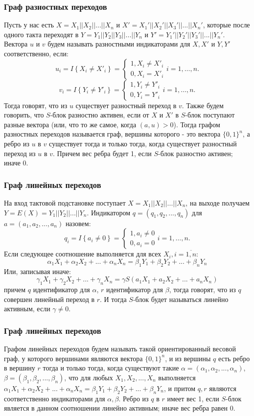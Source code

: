 \documentclass{beamer}
\begin{document}
  \begin{frame}
    \frametitle{Граф разностных переходов}
Пусть у нас есть $X=X_1||X_2||...||X_n$ и $X'=X_1'||X_2'||X_3'||...||X_n'$, которые после одного такта переходят в $Y=Y_1||Y_2||Y_3||...||Y_n$ и $Y'=Y_1'||Y_2'||Y_3'||...||Y_n'$. Вектора $u$ и $v$ будем называть разностными индикаторами для $X, X'$ и $Y, Y'$ соответственно, если:
$$
u_i=I\left\{X_i\ne X'_i\right\}=\left\{ \begin{array}{c}
1,X_i\ne X'_i \\
0,X_i=X'_i \end{array}
\right.i=1,\dots , n.
$$
$$
v_i=I\left\{Y_i\ne Y'_i\right\}=\left\{ \begin{array}{c}
1,Y_i\ne Y'_i \\
0,Y_i=Y'_i \end{array}
\right.i=1,\dots , n.
$$
Тогда говорят, что из $u$ существует разностный переход в $v$.
Также будем говорить, что $S$-блок разностно активен, если от $X$ и $X'$ в $S$-блок поступают разные вектора (или, что то же самое, когда $(a,u) > 0$).
Тогда графом разностных переходов называется граф, вершины которого - это вектора $\{0, 1\}^n$, а ребро из $u$ в $v$ существует тогда и только тогда, когда существует разностный переход из $u$ в $v$. Причем вес ребра будет 1, если $S$-блок разностно активен; иначе 0.

  \end{frame}
\begin{frame}
    \frametitle{Граф линейных переходов}
На вход тактовой подстановке поступает $X = X_1||X_2||...||X_n$, на выходе получаем $Y=E(X) = Y_1||Y_2||...||Y_n$.
Индикатором $q = (q_1, q_2, ..., q_n)$ для $a=(a_1, a_2, ..., a_n)$ назовем:
$$q_i=I\left\{a_i\ne 0\right\}=\left\{ \begin{array}{c}
1,a_i \neq 0 \\
0,a_i = 0\end{array}
\right.i=1,\dots , n.$$
Если следующее соотношение выполняется для всех $X_i, i=\overline{1,n}$:
$$\alpha_1X_1 + \alpha_2X_2 + ... + \alpha_nX_n = \beta_1Y_1 + \beta_2Y_2 + ... + \beta_nY_n$$
Или, записывая иначе:
$$\gamma_1X_1 + \gamma_2X_2 + ... + \gamma_nX_n = \gamma S(a_1X_1 + a_2X_2 + ... + a_nX_n)$$
причем $q$ идентификатор для $\alpha$, $r$ идентификатор для $\beta$, тогда говорят, что из $q$ совершен линейный переход в $r$. И тогда $S$-блок будет называться линейно активным, если $\gamma \neq 0$.
  \end{frame}
\begin{frame}
    \frametitle{Граф линейных переходов}
Графом линейных переходов будем называть такой ориентированный весовой граф, у которого вершинами являются вектора $\{0, 1\}^n$, и из вершины $q$ есть ребро в вершину $r$ тогда и только тогда, когда существуют такие $\alpha = (\alpha_1, \alpha_2, ..., \alpha_n)$, $\beta = (\beta_1, \beta_2, ..., \beta_n)$, что для любых $X_1, X_2, ..., X_n$ выполняется $\alpha_1X_1 + \alpha_2X_2 + ... + \alpha_nX_n = \beta_1Y_1 + \beta_2Y_2 + ... + \beta_nY_n$, и притом $q, r$ являются соответственно индикаторами для $\alpha, \beta$. Ребро из $q$ в $r$ имеет вес 1, если $S$-блок является в данном соотношении линейно активным; иначе вес ребра равен 0.
  \end{frame}
\end{document}
